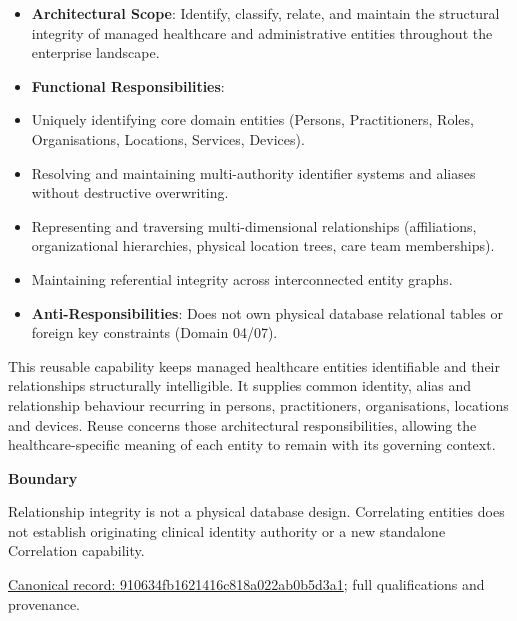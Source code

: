\begin{itemize}


\item \textbf{Architectural Scope}: Identify, classify, relate, and maintain the structural integrity of managed healthcare and administrative entities throughout the enterprise landscape.

\item \textbf{Functional Responsibilities}:

\item Uniquely identifying core domain entities (Persons, Practitioners, Roles, Organisations, Locations, Services, Devices).

\item Resolving and maintaining multi-authority identifier systems and aliases without destructive overwriting.

\item Representing and traversing multi-dimensional relationships (affiliations, organizational hierarchies, physical location trees, care team memberships).

\item Maintaining referential integrity across interconnected entity graphs.

\item \textbf{Anti-Responsibilities}: Does not own physical database relational tables or foreign key constraints (Domain 04/07).

\end{itemize}


This reusable capability keeps managed healthcare entities identifiable and their relationships structurally intelligible. It supplies common identity, alias and relationship behaviour recurring in persons, practitioners, organisations, locations and devices. Reuse concerns those architectural responsibilities, allowing the healthcare-specific meaning of each entity to remain with its governing context.



\textbf{Boundary}



Relationship integrity is not a physical database design. Correlating entities does not establish originating clinical identity authority or a new standalone Correlation capability.


{\footnotesize \href{../../../../../../../continuum/strategy/capability/910634fb1621416c818a022ab0b5d3a1.md}{Canonical record: 910634fb1621416c818a022ab0b5d3a1}; full qualifications and provenance.}\par
